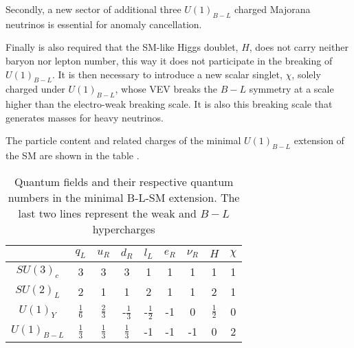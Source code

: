 Secondly, a new sector of additional three $U(1)_{B-L}$ charged Majorana neutrinos is essential for anomaly cancellation. 

Finally is also required that the SM-like Higgs doublet, $H$, does not carry neither baryon nor lepton number, this way it does not participate in the breaking of $U(1)_{B-L}$. It is then necessary to introduce a new scalar singlet, $\chi$, solely charged under $U(1)_{B-L}$, whose VEV breaks the $B-L$ symmetry at a scale higher than the electro-weak breaking scale. It is also this breaking scale that generates masses for heavy neutrinos. 

The particle content and related charges of the minimal $U(1)_{B-L}$ extension of the SM are shown in the table .

\begin{table}[htb!]
\centering
\begin{tabular}{|c|c|c|c|c|c|c|c|c|}
\hline
  & $q_L$  & $u_R$ & $d_R$ & $l_L$  & $e_R$ & $\nu_R$  &  $H$  & $\chi$  \\ \hline
 $SU(3)_c$& 3 & 3 & 3 & 1 & 1 & 1 & 1  & 1  \\
 $SU(2)_L$& 2  & 1 & 1 & 2 & 1 & 1 & 2  & 1 \\
$U(1)_Y$ & $\frac{1}{6}$ & $\frac{2}{3}$  & -$\frac{1}{3}$  & -$\frac{1}{2}$ & -1 & 0 & $\frac{1}{2}$ & 0 \\
$U(1)_{B-L}$ & $\frac{1}{3}$ & $\frac{1}{3}$ & $\frac{1}{3}$  & -1  & -1 &-1  & 0 & 2  \\ \hline 
\end{tabular}
\caption{Quantum fields and their respective quantum numbers in the minimal B-L-SM extension. The last two lines represent the weak and $B-L$ hypercharges}
\label{Charges}
\end{table} 


